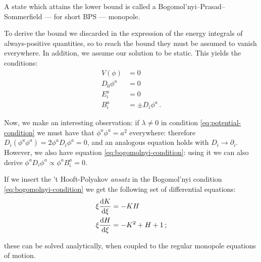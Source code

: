 \documentclass[main.tex]{subfiles}
\begin{document}
A state which attains the lower bound is called a Bogomol'nyi–Prasad–Sommerfield --- for short BPS --- monopole.

To derive the bound we discarded in the expression of the energy integrals of always-positive quantities, so to reach the bound they must be assumed to vanish everywhere. In addition, we assume our solution to be static. This yields the conditions:
%
\begin{subequations}
\begin{align}
  V(\phi) &= 0 \label{eq:potential-condition}   \\
  D_0 \phi^a &= 0  \\
  E_i^a &= 0  \\
  B_i^a &= \pm D_i \phi^a  \label{eq:bogomolnyi-condition} \,.
\end{align}
\end{subequations}

Now, we make an interesting observation: if \(\lambda \neq 0\) in condition \eqref{eq:potential-condition} we must have that \(\phi^a \phi^a = a^2\) everywhere: therefore \(D_i (\phi^a \phi^a) = 2 \phi^a D_i \phi^a = 0\), and an analogous equation holds with \(D_i \rightarrow \partial_i\).
However, we also have equation \eqref{eq:bogomolnyi-condition}: using it we can also derive \(\phi^a D_i \phi^a \propto \phi^a B_i^a = 0\).

If we insert the 't Hooft-Polyakov \emph{ansatz} in the Bogomol'nyi condition \eqref{eq:bogomolnyi-condition} we get the following set of differential equations:
%
\begin{subequations}
\begin{align}
  \xi \dv{K}{\xi}  &=  -KH   \\
  \xi \dv{H}{\xi} &= -K^2 + H + 1 \,;
\end{align}
\end{subequations}

these can be solved analytically, when coupled to the regular monopole equations of motion.

\end{document}
